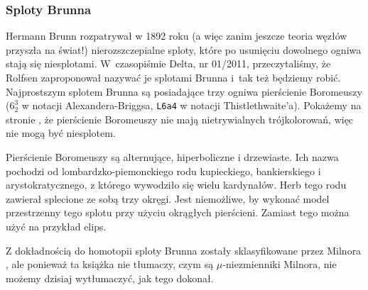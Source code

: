 
\subsubsection{Sploty Brunna}
%
Hermann Brunn \cite{brunn1892} rozpatrywał w 1892 roku (a więc zanim jeszcze teoria węzłów przyszła na świat!) nierozszczepialne sploty, które po usunięciu dowolnego ogniwa stają się niesplotami.
%
W~czasopiśmie Delta, nr 01/2011, przeczytaliśmy, że Rolfsen zaproponował nazywać je splotami Brunna i~tak też będziemy robić.
Najprostszym splotem Brunna są posiadające trzy ogniwa pierścienie Boromeuszy ($6_2^3$ w notacji Alexandera-Briggsa, \texttt{L6a4} w notacji Thistlethwaite'a).
%
Pokażemy na stronie \pageref{boromean_not_splittable}, że pierścienie Boromeuszy nie mają nietrywialnych trójkolorowań, więc nie mogą być niesplotem.

Pierścienie Boromeuszy są alternujące, hiperboliczne i drzewiaste.
%
%
%
%
Ich nazwa pochodzi od lombardzko-piemonckiego rodu kupieckiego, bankierskiego i arystokratycznego, z którego wywodziło się wielu kardynałów.
Herb tego rodu zawierał splecione ze sobą trzy okręgi.
Jest niemożliwe, by wykonać model przestrzenny tego splotu przy użyciu okrągłych pierścieni.
Zamiast tego można użyć na przykład elips.

Z dokładnością do homotopii sploty Brunna zostały sklasyfikowane przez Milnora \cite{milnor1954}, ale ponieważ ta książka nie tłumaczy, czym są $\mu$-niezmienniki Milnora, nie możemy dzisiaj wytłumaczyć, jak tego dokonał.
%
%

